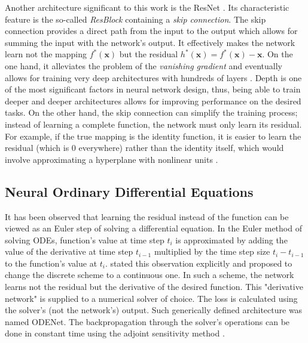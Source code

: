 Another architecture significant to this work is the \ac{ResNet} \cite{He2015}. Its characteristic feature is the so-called \emph{\ac{ResBlock}} containing a \emph{skip connection}. The skip connection provides a direct path from the input to the output which allows for summing the input with the network's output. It effectively makes the network learn not the mapping $f^*(\pmb{x})$ but the residual $h^*(\pmb{x}) = f^*(\pmb{x}) - \pmb{x}$. On the one hand, it alleviates the problem of the \emph{vanishing gradient} \cite{Goodfellow-et-al-2016} and eventually allows for training very deep architectures with hundreds of layers \cite{He2015}. Depth is one of the most significant factors in neural network design, thus, being able to train deeper and deeper architectures allows for improving performance on the desired tasks. On the other hand, the skip connection can simplify the training process; instead of learning a complete function, the network must only learn its residual. For example, if the true mapping is the identity function, it is easier to learn the residual (which is $0$ everywhere) rather than the identity itself, which would involve approximating a hyperplane with nonlinear units \cite{He2015}.

\subsection{Neural Ordinary Differential Equations}
\label{sec:neural_odes}


It has been observed that learning the residual instead of the function can be viewed as an Euler step of solving a differential equation. In the Euler method of solving \acp{ODE}, function's value at time step $t_i$ is approximated by adding the value of the derivative at time step $t_{i-1}$ multiplied by the time step size $t_i - t_{i-1}$ to the function's value at $t_i$. \cite{Chen2018} stated this observation explicitly and proposed to change the discrete scheme to a continuous one. In such a scheme, the network learns not the residual but the derivative of the desired function. This "derivative network" is supplied to a numerical solver of choice. The loss is calculated using the solver's (not the network's) output. Such generically defined architecture was named ODENet. The backpropagation through the solver's operations can be done in constant time using the adjoint sensitivity method \cite{Chen2018}.

